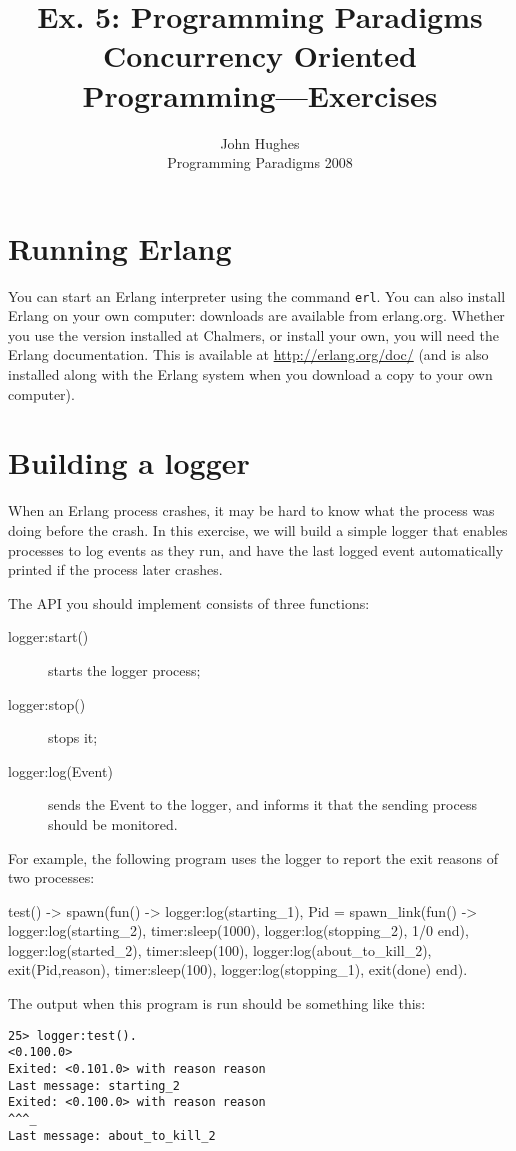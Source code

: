 \documentclass{article}
\newcommand{\courseinfo}{ John Hughes \\ Programming Paradigms 2008 }
\begin{document}
\title{Ex. 5: Programming Paradigms 
\\
Concurrency Oriented Programming—Exercises}
\author{\courseinfo}
\date{}
\maketitle

\section{Running Erlang}

You can start an Erlang interpreter using the command \verb!erl!. You can also install Erlang on your own computer: downloads are available from erlang.org. Whether you use the version installed at Chalmers, or install your own, you will need the Erlang documentation. This is available at \url{http://erlang.org/doc/} (and is also installed along with the Erlang system when you download a copy to your own computer).


\section{Building a logger}

When an Erlang process crashes, it may be hard to know what the
process was doing before the crash. In this exercise, we will build a
simple logger that enables processes to log events as they run, and
have the last logged event automatically printed if the process later
crashes.

The API you should implement consists of three functions:

\begin{description}
\item[logger:start()]  starts the logger process;
\item[logger:stop()]   stops it;
\item[logger:log(Event)]  sends the \textsf{Event} to the logger, and informs it that the sending process should be monitored.
\end{description}

For example, the following program uses the logger to report the exit reasons of two processes:
\begin{erlang}
test() ->
    spawn(fun() ->
	  logger:log(starting_1),
	  Pid = spawn_link(fun() ->
			   logger:log(starting_2),
			   timer:sleep(1000),
			   logger:log(stopping_2),
			   1/0
		   end),
	  logger:log(started_2),
	  timer:sleep(100),
	  logger:log(about_to_kill_2),
	  exit(Pid,reason),
	  timer:sleep(100),
	  logger:log(stopping_1),
	  exit(done)
	end).
\end{erlang}
The output when this program is run should be something  like this:
\begin{verbatim}
25> logger:test().
<0.100.0>
Exited: <0.101.0> with reason reason
Last message: starting_2
Exited: <0.100.0> with reason reason
^^^_
Last message: about_to_kill_2
\end{verbatim}
\end{document}

